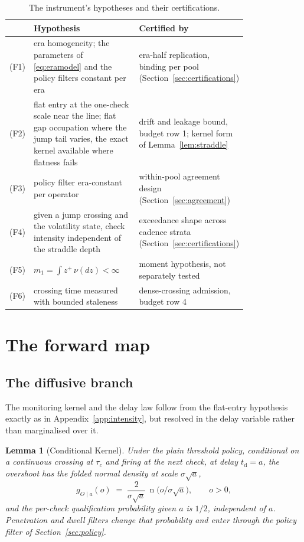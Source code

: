 \documentclass[11pt,a4paper]{article}
\theoremstyle{definition}
\theoremstyle{plain}
\newtheorem{lemma}{Lemma}
\theoremstyle{remark}
\DeclareMathOperator{\nden}{n}
\newcommand{\tact}{t_{\mathrm{d}}}
\begin{document}
\begin{table}[H]
\centering
\caption{The instrument's hypotheses and their certifications.}
\label{tab:hypotheses}
{\footnotesize
\begin{tabular}{@{}lp{0.46\linewidth}p{0.34\linewidth}@{}}
\toprule
 & Hypothesis & Certified by \\
\midrule
(F1) & era homogeneity; the parameters of \eqref{eq:eramodel} and the policy filters constant per era & era-half replication, binding per pool (Section~\ref{sec:certifications}) \\
(F2) & flat entry at the one-check scale near the line; flat gap occupation where the jump tail varies, the exact kernel available where flatness fails & drift and leakage bound, budget row 1; kernel form of Lemma~\ref{lem:straddle} \\
(F3) & policy filter era-constant per operator & within-pool agreement design (Section~\ref{sec:agreement}) \\
(F4) & given a jump crossing and the volatility state, check intensity independent of the straddle depth & exceedance shape across cadence strata (Section~\ref{sec:certifications}) \\
(F5) & $m_1 = \int z^{+}\, \nu(dz) < \infty$ & moment hypothesis, not separately tested \\
(F6) & crossing time measured with bounded staleness & dense-crossing admission, budget row 4 \\
\bottomrule
\end{tabular}}
\end{table}

\section{The forward map}\label{sec:forward}

\subsection{The diffusive branch}\label{sec:diffusive}

The monitoring kernel and the delay law follow from the flat-entry hypothesis exactly as in Appendix~\ref{app:intensity}, but resolved in the delay variable rather than marginalised over it.

\begin{lemma}[Conditional Kernel]\label{lem:kernel}
Under the plain threshold policy, conditional on a continuous crossing at $\tau_c$ and firing at the next check, at delay $\tact = a$, the overshoot has the folded normal density at scale $\sigma\sqrt{a}$,
\[
g_{O \mid a}(o) \;=\; \frac{2}{\sigma\sqrt{a}}\,
\nden\big(o/\sigma\sqrt{a}\big), \qquad o > 0,
\]
and the per-check qualification probability given $a$ is $1/2$, independent of $a$. Penetration and dwell filters change that probability and enter through the policy filter of Section~\ref{sec:policy}.
\end{lemma}
\end{document}
